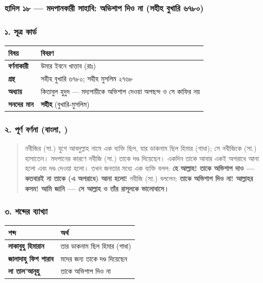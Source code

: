 \subsubsection*{হাদিস ১৮ — মদপানকারী সাহাবি: অভিশাপ দিও না (সহীহ বুখারি ৬৭৮০)}

\subsubsection*{১. সূত্র কার্ড}

\begin{table}[h]\centering\small
\begin{tabular}{ll}
বিষয় & বিবরণ \\
\hline
\textbf{বর্ণনাকারী} & উমার ইবনে খাত্তাব (রাঃ) \\
\textbf{গ্রন্থ} & সহীহ বুখারি ৬৭৮০; সহীহ মুসলিম ২৭৬৮ \\
\textbf{অধ্যায়} & কিতাবুল হুদুদ — মদ্যপায়ীকে অভিশাপ দেওয়া অপছন্দ ও সে কাফির নয় \\
\textbf{সনদের মান} & \textbf{সহীহ} (বুখারি-মুসলিম) \\
\hline
\end{tabular}
\end{table}

\subsubsection*{২. পূর্ণ বর্ণনা (বাংলা, )}

\begin{quote}
নবীজির (সা.) যুগে আবদুল্লাহ নামে এক ব্যক্তি ছিল, যার ডাকনাম ছিল হিমার (গাধা); সে নবীজিকে (সা.) হাসাতেন। মদপানের কারণে নবীজি (সা.) তাকে দণ্ড দিয়েছেন। একদিন তাকে আবার একই অপরাধে আনা হলো এবং দণ্ড দেওয়া হলো। তখন জনতার মধ্যে এক ব্যক্তি বলল: \textbf{হে আল্লাহ! তাকে অভিশাপ দাও — কতবারই না তাকে (এ অপরাধে) আনা হলো!} নবীজি (সা.) বললেন: \textbf{তাকে অভিশাপ দিও না! আল্লাহর কসম! আমি জানি — সে আল্লাহ ও তাঁর রাসূলকে ভালোবাসে।}
\end{quote}

\subsubsection*{৩. শব্দের ব্যাখ্যা}

\begin{table}[h]\centering\small
\begin{tabular}{ll}
শব্দ & অর্থ \\
\hline
\textbf{লাকাবুহু হিমারান} & তার ডাকনাম ছিল হিমার (গাধা) \\
\textbf{জালাদাহু ফিশ শারাব} & মদের জন্য তাকে দণ্ড দিয়েছেন \\
\textbf{লা তাল'আনূহু} & তাকে অভিশাপ দিও না \\
\hline
\end{tabular}
\end{table}

